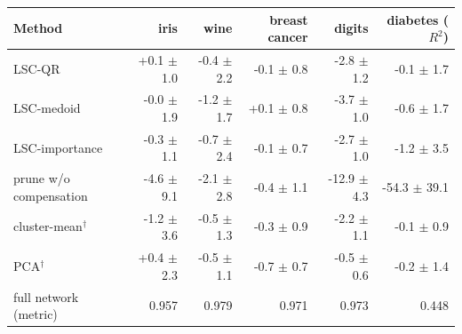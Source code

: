 \begin{tabular}{lrrrrr}\toprule
Method & iris & wine & breast cancer & digits & diabetes ($R^2$)\\\midrule
LSC-QR & +0.1 $\pm$ 1.0 & -0.4 $\pm$ 2.2 & -0.1 $\pm$ 0.8 & -2.8 $\pm$ 1.2 & -0.1 $\pm$ 1.7\\
LSC-medoid & -0.0 $\pm$ 1.9 & -1.2 $\pm$ 1.7 & +0.1 $\pm$ 0.8 & -3.7 $\pm$ 1.0 & -0.6 $\pm$ 1.7\\
LSC-importance & -0.3 $\pm$ 1.1 & -0.7 $\pm$ 2.4 & -0.1 $\pm$ 0.7 & -2.7 $\pm$ 1.0 & -1.2 $\pm$ 3.5\\
prune w/o compensation & -4.6 $\pm$ 9.1 & -2.1 $\pm$ 2.8 & -0.4 $\pm$ 1.1 & -12.9 $\pm$ 4.3 & -54.3 $\pm$ 39.1\\
cluster-mean$^\dagger$ & -1.2 $\pm$ 3.6 & -0.5 $\pm$ 1.3 & -0.3 $\pm$ 0.9 & -2.2 $\pm$ 1.1 & -0.1 $\pm$ 0.9\\
PCA$^\dagger$ & +0.4 $\pm$ 2.3 & -0.5 $\pm$ 1.1 & -0.7 $\pm$ 0.7 & -0.5 $\pm$ 0.6 & -0.2 $\pm$ 1.4\\
\midrule
full network (metric) & 0.957 & 0.979 & 0.971 & 0.973 & 0.448\\
\bottomrule\end{tabular}
